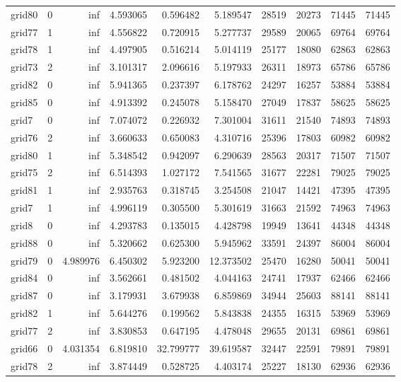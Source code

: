 \begin{longtable}{|l|r|r|r|r|r|r|r|r|r|}
grid80 & 0 & inf & 4.593065 & 0.596482 & 5.189547 & 28519 & 20273 & 71445 & 71445 \\
grid77 & 1 & inf & 4.556822 & 0.720915 & 5.277737 & 29589 & 20065 & 69764 & 69764 \\
grid78 & 1 & inf & 4.497905 & 0.516214 & 5.014119 & 25177 & 18080 & 62863 & 62863 \\
grid73 & 2 & inf & 3.101317 & 2.096616 & 5.197933 & 26311 & 18973 & 65786 & 65786 \\
grid82 & 0 & inf & 5.941365 & 0.237397 & 6.178762 & 24297 & 16257 & 53884 & 53884 \\
grid85 & 0 & inf & 4.913392 & 0.245078 & 5.158470 & 27049 & 17837 & 58625 & 58625 \\
grid7 & 0 & inf & 7.074072 & 0.226932 & 7.301004 & 31611 & 21540 & 74893 & 74893 \\
grid76 & 2 & inf & 3.660633 & 0.650083 & 4.310716 & 25396 & 17803 & 60982 & 60982 \\
grid80 & 1 & inf & 5.348542 & 0.942097 & 6.290639 & 28563 & 20317 & 71507 & 71507 \\
grid75 & 2 & inf & 6.514393 & 1.027172 & 7.541565 & 31677 & 22281 & 79025 & 79025 \\
grid81 & 1 & inf & 2.935763 & 0.318745 & 3.254508 & 21047 & 14421 & 47395 & 47395 \\
grid7 & 1 & inf & 4.996119 & 0.305500 & 5.301619 & 31663 & 21592 & 74963 & 74963 \\
grid8 & 0 & inf & 4.293783 & 0.135015 & 4.428798 & 19949 & 13641 & 44348 & 44348 \\
grid88 & 0 & inf & 5.320662 & 0.625300 & 5.945962 & 33591 & 24397 & 86004 & 86004 \\
grid79 & 0 & 4.989976 & 6.450302 & 5.923200 & 12.373502 & 25470 & 16280 & 50041 & 50041 \\
grid84 & 0 & inf & 3.562661 & 0.481502 & 4.044163 & 24741 & 17937 & 62466 & 62466 \\
grid87 & 0 & inf & 3.179931 & 3.679938 & 6.859869 & 34944 & 25603 & 88141 & 88141 \\
grid82 & 1 & inf & 5.644276 & 0.199562 & 5.843838 & 24355 & 16315 & 53969 & 53969 \\
grid77 & 2 & inf & 3.830853 & 0.647195 & 4.478048 & 29655 & 20131 & 69861 & 69861 \\
grid66 & 0 & 4.031354 & 6.819810 & 32.799777 & 39.619587 & 32447 & 22591 & 79891 & 79891 \\
grid78 & 2 & inf & 3.874449 & 0.528725 & 4.403174 & 25227 & 18130 & 62936 & 62936 \\

\end{longtable}
